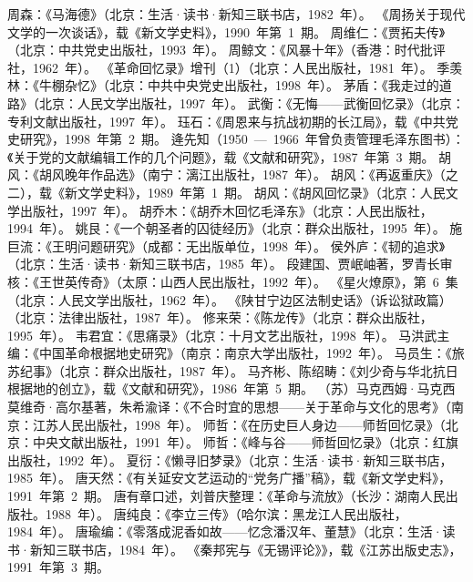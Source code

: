 \begin{thebibliography}{999}
\bibitem{}周森：《马海德》（北京：生活·读书·新知三联书店，1982~年）。
\bibitem{}《周扬关于现代文学的一次谈话》，载《新文学史料》，1990~年第~1~期。
\bibitem{}周维仁：《贾拓夫传》（北京：中共党史出版社，1993~年）。
\bibitem{}周鲸文：《风暴十年》（香港：时代批评社，1962~年）。
\bibitem{}《革命回忆录》增刊（1）（北京：人民出版社，1981~年）。
\bibitem{}季羡林：《牛棚杂忆》（北京：中共中央党史出版社，1998~年）。
\bibitem{}茅盾：《我走过的道路》（北京：人民文学出版社，1997~年）。
\bibitem{}武衡：《无悔——武衡回忆录》（北京：专利文献出版社，1997~年）。
\bibitem{}珏石：《周恩来与抗战初期的长江局》，载《中共党史研究》，1998~年第~2~期。
\bibitem{}逄先知（1950~—~1966~年曾负责管理毛泽东图书）：《关于党的文献编辑工作的几个问题》，载《文献和研究》，1987~年第~3~期。
\bibitem{}胡风：《胡风晚年作品选》（南宁：漓江出版社，1987~年）。
\bibitem{}胡风：《再返重庆》（之二），载《新文学史料》，1989~年第~1~期。
\bibitem{}胡风：《胡风回忆录》（北京：人民文学出版社，1997~年）。
\bibitem{}胡乔木：《胡乔木回忆毛泽东》（北京：人民出版社，1994~年）。
\bibitem{}姚艮：《一个朝圣者的囚徒经历》（北京：群众出版社，1995~年）。
\bibitem{}施巨流：《王明问题研究》（成都：无出版单位，1998~年）。
\bibitem{}侯外庐：《韧的追求》（北京：生活·读书·新知三联书店，1985~年）。
\bibitem{}段建国、贾岷岫著，罗青长审核：《王世英传奇》（太原：山西人民出版社，1992~年）。
\bibitem{}《星火燎原》，第~6~集（北京：人民文学出版社，1962~年）。
\bibitem{}《陕甘宁边区法制史话》（诉讼狱政篇）（北京：法律出版社，1987~年）。
\bibitem{}修来荣：《陈龙传》（北京：群众出版社，1995~年）。
\bibitem{}韦君宜：《思痛录》（北京：十月文艺出版社，1998~年）。
\bibitem{}马洪武主编：《中国革命根据地史研究》（南京：南京大学出版社，1992~年）。
\bibitem{}马员生：《旅苏纪事》（北京：群众出版社，1987~年）。
\bibitem{}马齐彬、陈绍畴：《刘少奇与华北抗日根据地的创立》，载《文献和研究》，1986~年第~5~期。
\bibitem{}（苏）马克西姆·马克西莫维奇·高尔基著，朱希渝译：《不合时宜的思想——关于革命与文化的思考》（南京：江苏人民出版社，1998~年）。
\bibitem{}师哲：《在历史巨人身边——师哲回忆录》（北京：中央文献出版社，1991~年）。
\bibitem{}师哲：《峰与谷——师哲回忆录》（北京：红旗出版社，1992~年）。
\bibitem{}夏衍：《懒寻旧梦录》（北京：生活·读书·新知三联书店，1985~年）。
\bibitem{}唐天然：《有关延安文艺运动的“党务广播”稿》，载《新文学史料》，1991~年第~2~期。
\bibitem{}唐有章口述，刘普庆整理：《革命与流放》（长沙：湖南人民出版社。1988~年）。
\bibitem{}唐纯良：《李立三传》（哈尔滨：黑龙江人民出版社，1984~年）。
\bibitem{}唐瑜编：《零落成泥香如故——忆念潘汉年、董慧》（北京：生活·读书·新知三联书店，1984~年）。
\bibitem{}《秦邦宪与《无锡评论》》，载《江苏出版史志》，1991~年第~3~期。

\end{thebibliography}

